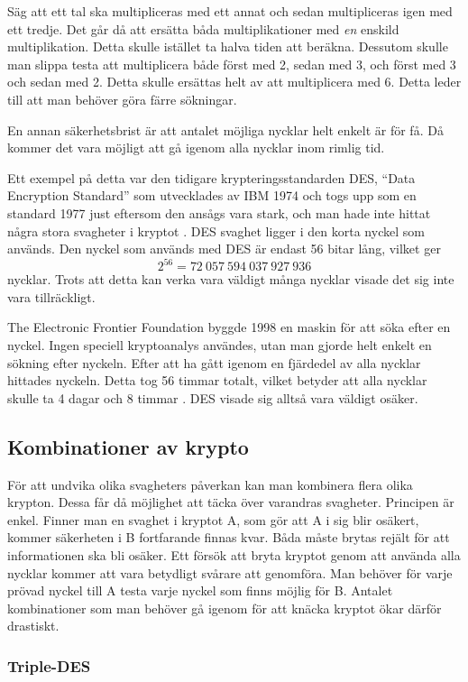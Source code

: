 \documentclass{article}
\begin{document}
	Säg att ett tal ska multipliceras med ett annat och sedan multipliceras igen med ett tredje. Det går då att ersätta båda multiplikationer med \emph{en} enskild multiplikation. Detta skulle istället ta halva tiden att beräkna. Dessutom skulle man slippa testa att multiplicera både först med 2, sedan med 3, och först med 3 och sedan med 2. Detta skulle ersättas helt av att multiplicera med 6. Detta leder till att man behöver göra färre sökningar.

En annan säkerhetsbrist är att antalet möjliga nycklar helt enkelt är för få. Då kommer det vara möjligt att gå igenom alla nycklar inom rimlig tid.

Ett exempel på detta var den tidigare krypteringsstandarden DES, ``Data Encryption Standard'' som utvecklades av IBM 1974 och togs upp som en standard 1977 just eftersom den ansågs vara stark, och man hade inte hittat några stora svagheter i kryptot \cite{ibm}. DES svaghet ligger i den korta nyckel som används. Den nyckel som används med DES är endast 56 bitar lång, vilket ger \[2^{56}=72\ 057\ 594\ 037\ 927\ 936\] nycklar. Trots att detta kan verka vara väldigt många nycklar visade det sig inte vara tillräckligt.

The Electronic Frontier Foundation byggde 1998 en maskin för att söka efter en nyckel. Ingen speciell kryptoanalys användes, utan man gjorde helt enkelt en sökning efter nyckeln. Efter att ha gått igenom en fjärdedel av alla nycklar hittades nyckeln. Detta tog 56 timmar totalt, vilket betyder att alla nycklar skulle ta 4 dagar och 8 timmar \cite{eff}. DES visade sig alltså vara väldigt osäker.

	\subsection {Kombinationer av krypto}

	För att undvika olika svagheters påverkan kan man kombinera flera olika krypton. Dessa får då möjlighet att täcka över varandras svagheter. Principen är enkel. Finner man en svaghet i kryptot A, som gör att A i sig blir osäkert, kommer säkerheten i B fortfarande finnas kvar. Båda måste brytas rejält för att informationen ska bli osäker. Ett försök att bryta kryptot genom att använda alla nycklar kommer att vara betydligt svårare att genomföra. Man behöver för varje prövad nyckel till A testa varje nyckel som finns möjlig för B. Antalet kombinationer som man behöver gå igenom för att knäcka kryptot ökar därför drastiskt.

		\subsubsection {Triple-DES}
\end{document}
